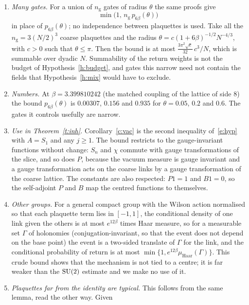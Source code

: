 \begin{remark}\label{r:ret}
\leavevmode
\begin{enumerate}
\item[(a)] \emph{Many gates.} For a union of $n_{\mathrm g}$ gates of radius $\theta$ the same proofs give
\[\min\big(1,\,n_{\mathrm g}\,p_{6\beta}(\theta)\big)\]
in place of $p_{6\beta}(\theta)$; no independence between plaquettes is used. Take all the
$n_{\mathrm g}=3(N/2)^3$ coarse plaquettes and the radius $\theta=c(1+6\beta)^{-1/2}N^{-4/3}$, with $c>0$ such that
$\theta\le\pi$. Then the bound is at most $\tfrac{3\pi^2\sqrt e}{32}\,c^3/N$, which is summable over dyadic $N$. Summability of the return weights is not the budget of
Hypothesis~\ref{h:budget}, and gates this narrow need not contain the fields that Hypothesis~\ref{h:mix}
would have to exclude.
\item[(b)] \emph{Numbers.} At $\beta=3.399810242$ (the matched coupling of the lattice of side $8$) the bound $p_{6\beta}(\theta)$ is $0.00307$, $0.156$ and $0.935$ for
$\theta=0.05$, $0.2$ and $0.6$. The gates it controls usefully are narrow.
\item[(c)] \emph{Use in Theorem~\ref{t:inh}.} Corollary~\ref{c:vac} is the second inequality
of~\eqref{e:hyp} with $A=S_1$ and any $j\ge1$. The bound restricts to the gauge-invariant functions without change: $S_n$ and $\chi$ commute with gauge
transformations of the slice, and so does $P$, because the vacuum measure is gauge invariant and a gauge
transformation acts on the coarse links by a gauge transformation of the coarse lattice. The constants are also respected: $P1=1$ and $B1=0$, so the self-adjoint $P$ and $B$ map the
centred functions to themselves.
\item[(d)] \emph{Other groups.} For a general compact group with the Wilson action normalised so that each plaquette term lies in
$[-1,1]$, the conditional density of one link given the others is at most $e^{12\beta}$ times Haar measure,
so for a measurable set $\Gamma$ of holonomies (conjugation-invariant, so that the event does not depend on the
base point) the event is a two-sided translate of $\Gamma$ for the link, and the conditional probability of return
is at most $\min\{1,e^{12\beta}\mu_{\mathrm{Haar}}(\Gamma)\}$. This crude bound shows that the mechanism is not tied to a
centre; it is far weaker than the $\mathrm{SU}(2)$ estimate and we make no use of it.
\item[(e)] \emph{Plaquettes far from the identity are typical.} This follows from the same lemma, read the other way. Given

\end{enumerate}
\end{remark}
